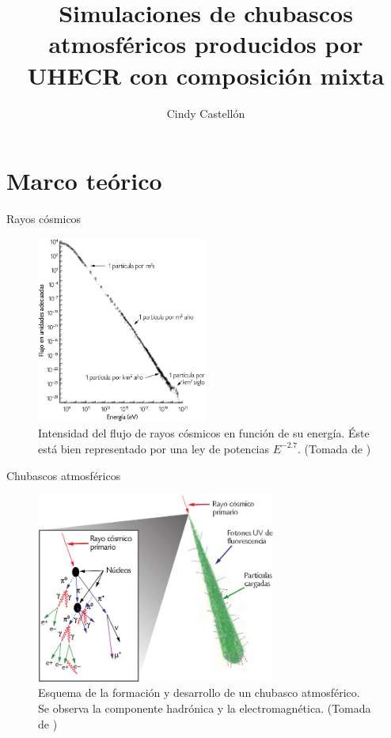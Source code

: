 \documentclass[10pt]{beamer}
\author{Cindy Castellón}
\title[Simulaciones de chubascos con composición mixta]{Simulaciones de chubascos atmosféricos producidos por UHECR con composición mixta}
\institute{Escuela de Física, Universidad de El Salvador}
\begin{document}
\begin{frame}
\titlepage
\end{frame}

\begin{frame}
\tableofcontents
\end{frame}

\section{Marco teórico}

\begin{frame}{Rayos cósmicos}
\begin{figure}
\includegraphics[width=0.5\textwidth]{Figuras/espectro_RC} 
\caption{Intensidad del flujo de rayos cósmicos en función de su energía. Éste está bien representado por una ley de potencias $E^{-2.7}$. (Tomada de \cite{Poderosas})}
\end{figure}
\end{frame}

\begin{frame}{Chubascos atmosféricos}
\begin{figure}
	\centering
	\includegraphics[width=0.7\textwidth]{Figuras/air_shower} 
	\caption{Esquema de la formación y desarrollo de un chubasco atmosférico. Se observa la componente hadrónica y la electromagnética. (Tomada de \cite{Poderosas})}
	\label{fig:airshower}
	\end{figure}	
\end{frame}
\end{document}
